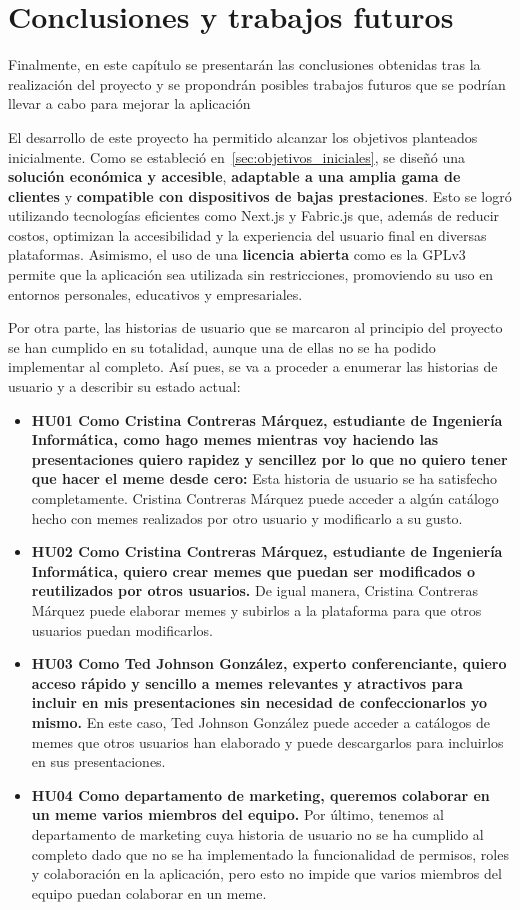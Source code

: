 \chapter{Conclusiones y trabajos futuros}

Finalmente, en este capítulo se presentarán las conclusiones obtenidas tras la realización del proyecto y se propondrán posibles trabajos futuros que se podrían llevar a cabo para mejorar la aplicación

El desarrollo de este proyecto ha permitido alcanzar los objetivos planteados inicialmente. Como se estableció en~\ref{sec:objetivos_iniciales}, se diseñó una \textbf{solución económica y accesible}, \textbf{adaptable a una amplia gama de clientes} y \textbf{compatible con dispositivos de bajas prestaciones}. Esto se logró utilizando tecnologías eficientes como Next.js y Fabric.js que, además de reducir costos, optimizan la accesibilidad y la experiencia del usuario final en diversas plataformas. Asimismo, el uso de una \textbf{licencia abierta} como es la GPLv3~\cite{gplv3} permite que la aplicación sea utilizada sin restricciones, promoviendo su uso en entornos personales, educativos y empresariales.

Por otra parte, las historias de usuario que se marcaron al principio del proyecto se han cumplido en su totalidad, aunque una de ellas no se ha podido implementar al completo. Así pues, se va a proceder a enumerar las historias de usuario y a describir su estado actual:

\begin{itemize}
  \item[\bien] \textbf{HU01 Como Cristina Contreras Márquez, estudiante de Ingeniería Informática, como hago memes mientras voy haciendo las presentaciones quiero rapidez y sencillez por lo que no quiero tener que hacer el meme desde cero:} Esta historia de usuario se ha satisfecho completamente. Cristina Contreras Márquez puede acceder a algún catálogo hecho con memes realizados por otro usuario y modificarlo a su gusto.
  \item[\bien] \textbf{HU02 Como Cristina Contreras Márquez, estudiante de Ingeniería Informática, quiero crear memes que puedan ser modificados o reutilizados por otros usuarios.} De igual manera, Cristina Contreras Márquez puede elaborar memes y subirlos a la plataforma para que otros usuarios puedan modificarlos.
  \item[\bien] \textbf{HU03 Como Ted Johnson González, experto conferenciante, quiero acceso rápido y sencillo a memes relevantes y atractivos para incluir en mis presentaciones sin necesidad de confeccionarlos yo mismo.} En este caso, Ted Johnson González puede acceder a catálogos de memes que otros usuarios han elaborado y puede descargarlos para incluirlos en sus presentaciones.
  \item[\regular] \textbf{HU04 Como departamento de marketing, queremos colaborar en un meme varios miembros del equipo.} Por último, tenemos al departamento de marketing cuya historia de usuario no se ha cumplido al completo dado que no se ha implementado la funcionalidad de permisos, roles y colaboración en la aplicación, pero esto no impide que varios miembros del equipo puedan colaborar en un meme.
\end{itemize}

